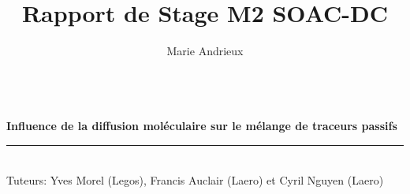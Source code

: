 \documentclass[a4paper,12pt]{article}
\date{}
\title{ \Large{Rapport de Stage M2 SOAC-DC}}
\author{Marie Andrieux}
\newcommand{\HRule}{\rule{\linewidth}{0.5mm}}
\newcommand{\blap}[1]{\vbox to 0pt{#1\vss}}
\newcommand\AtUpperLeftCorner[3]{%
  \put(\LenToUnit{#1},\LenToUnit{\dimexpr\paperheight-#2}){\blap{#3}}%
}
\newcommand\AtUpperRightCorner[3]{%
  \put(\LenToUnit{\dimexpr\paperwidth-#1},\LenToUnit{\dimexpr\paperheight-#2}){\blap{\llap{#3}}}%
}
\begin{document}
\thispagestyle{empty}

\let\noparref\ref
\renewcommand{\ref}[1]{(\noparref{#1})}


\begin{titlepage}
    \enlargethispage{2cm}
 
    \AddToShipoutPicture{
        }
 
    \begin{center}
        \vspace*{10cm}
        \textsc{\@title} \\
        \newline
        \large{\bf Influence de la diffusion moléculaire sur le mélange de traceurs passifs}
        \HRule
        \vspace*{0.5cm}
        \large{\@author} \\
        \newline
        \small{Tuteurs: Yves Morel (Legos), Francis Auclair (Laero) et Cyril Nguyen (Laero)}
        
    \end{center}
 
    \vspace*{9.2cm}
 
    \begin{center}
    \end{center}
 
\end{titlepage}
\ClearShipoutPicture

\newpage
\renewcommand{\thepage}{\arabic{page}}
\setcounter{page}{1}
\end{document}
